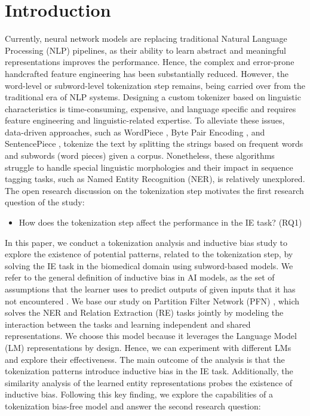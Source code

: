 \documentclass[runningheads]{llncs}
\begin{document}
\section{Introduction}
\vspace{-3mm}
Currently, neural network models are replacing traditional Natural Language Processing (NLP) pipelines, as their ability to learn abstract and meaningful representations improves the performance. Hence, the complex and error-prone handcrafted feature engineering has been substantially reduced. However, the word-level or subword-level tokenization step remains, being carried over from the traditional era of NLP systems. Designing a custom tokenizer based on linguistic characteristics is time-consuming, expensive, and language specific and requires feature engineering and linguistic-related expertise. To alleviate these issues, data-driven approaches, such as WordPiece \cite{wu2016google}, Byte Pair Encoding \cite{sennrich2016neural}, and SentencePiece \cite{kudo2018sentencepiece}, tokenize the text by splitting the strings based on frequent words and subwords (word pieces) given a corpus. Nonetheless, these algorithms struggle to handle special linguistic morphologies \cite{clark2021canine} and their impact in sequence tagging tasks, such as Named Entity Recognition (NER), is relatively unexplored. The open research discussion on the tokenization step motivates the first research question of the study:

\begin{itemize}
    \vspace{-2.5mm}
    \item How does the tokenization step affect the performance in the IE task? (RQ1) 
    \vspace{-2.5mm}
\end{itemize}

In this paper, we conduct a tokenization analysis and inductive bias study to explore the existence of potential patterns, related to the tokenization step, by solving the IE task in the biomedical domain using subword-based models. We refer to the general definition of inductive bias in AI models, as the set of assumptions that the learner uses to predict outputs of given inputs that it has not encountered \cite{mitchell1980need}. We base our study on Partition Filter Network (PFN) \cite{yan-etal-2021-partition}, which solves the NER \cite{nadeau2007survey,florian-etal-2010-improving}  and Relation Extraction (RE) \cite{sun-etal-2011-semi,plank-moschitti-2013-embedding} tasks jointly by modeling the interaction between the tasks and learning independent and shared representations. We choose this model because it leverages the Language Model (LM) representations by design. Hence, we can experiment with different LMs and explore their effectiveness. The main outcome of the analysis is that the tokenization patterns introduce inductive bias in the IE task. Additionally, the similarity analysis of the learned entity representations probes the existence of inductive bias. Following this key finding, we explore the capabilities of a tokenization bias-free model and answer the second research question:
\end{document}
